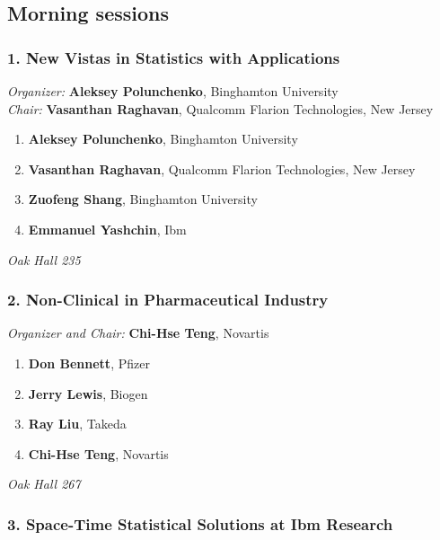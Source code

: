 
\subsection*{Morning sessions}

\subsubsection*{1. New Vistas in Statistics with Applications}

\emph{Organizer:} \textbf{Aleksey Polunchenko}, Binghamton University \\
\emph{Chair:} \textbf{Vasanthan Raghavan}, Qualcomm Flarion Technologies, New Jersey

\begin{enumerate}
\item \textbf{Aleksey Polunchenko}, Binghamton University 
\item \textbf{Vasanthan Raghavan}, Qualcomm Flarion Technologies, New Jersey 
\item \textbf{Zuofeng Shang}, Binghamton University 
\item \textbf{Emmanuel Yashchin}, Ibm 
\end{enumerate}

\emph{Oak Hall 235} \\[.5em]

\subsubsection*{2. Non-Clinical in Pharmaceutical Industry}

\emph{Organizer and Chair:} \textbf{Chi-Hse Teng}, Novartis

\begin{enumerate}
\item \textbf{Don Bennett}, Pfizer 
\item \textbf{Jerry Lewis}, Biogen 
\item \textbf{Ray Liu}, Takeda 
\item \textbf{Chi-Hse Teng}, Novartis 
\end{enumerate}

\emph{Oak Hall 267} \\[.5em]

\subsubsection*{3. Space-Time Statistical Solutions at Ibm Research}

